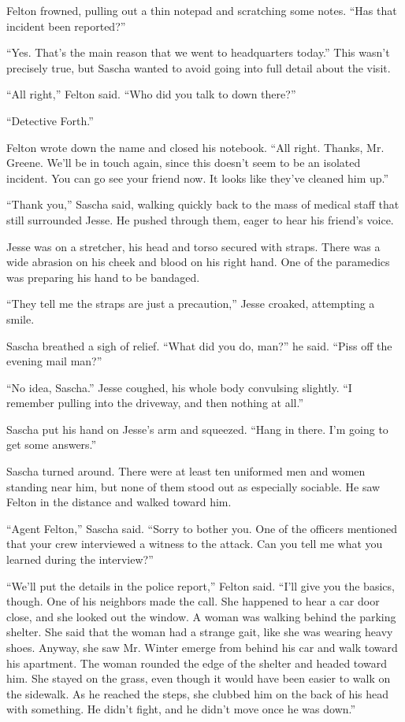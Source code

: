 \documentclass[12pt]{book}
\begin{document}
Felton frowned, pulling out a thin notepad and scratching some notes.  ``Has that incident been reported?''

``Yes.  That's the main reason that we went to headquarters today.''  This wasn't precisely true, but Sascha wanted to avoid going into full detail about the visit.

``All right,'' Felton said.  ``Who did you talk to down there?''

``Detective Forth.''

Felton wrote down the name and closed his notebook.  ``All right.  Thanks, Mr. Greene.  We'll be in touch again, since this doesn't seem to be an isolated incident.  You can go see your friend now.  It looks like they've cleaned him up.''

``Thank you,'' Sascha said, walking quickly back to the mass of medical staff that still surrounded Jesse.  He pushed through them, eager to hear his friend's voice.

Jesse was on a stretcher, his head and torso secured with straps.  There was a wide abrasion on his cheek and blood on his right hand.  One of the paramedics was preparing his hand to be bandaged.

``They tell me the straps are just a precaution,'' Jesse croaked, attempting a smile.

Sascha breathed a sigh of relief.  ``What did you do, man?'' he said.  ``Piss off the evening mail man?''

``No idea, Sascha.''  Jesse coughed, his whole body convulsing slightly.  ``I remember pulling into the driveway, and then nothing at all.''

Sascha put his hand on Jesse's arm and squeezed.  ``Hang in there.  I'm going to get some answers.''

Sascha turned around.  There were at least ten uniformed men and women standing near him, but none of them stood out as especially sociable.  He saw Felton in the distance and walked toward him.

``Agent Felton,'' Sascha said.  ``Sorry to bother you.  One of the officers mentioned that your crew interviewed a witness to the attack.  Can you tell me what you learned during the interview?''

``We'll put the details in the police report,'' Felton said.  ``I'll give you the basics, though.  One of his neighbors made the call.  She happened to hear a car door close, and she looked out the window.  A woman was walking behind the parking shelter.  She said that the woman had a strange gait, like she was wearing heavy shoes.  Anyway, she saw Mr. Winter emerge from behind his car and walk toward his apartment.  The woman rounded the edge of the shelter and headed toward him.  She stayed on the grass, even though it would have been easier to walk on the sidewalk.  As he reached the steps, she clubbed him on the back of his head with something.  He didn't fight, and he didn't move once he was down.''
\end{document}
